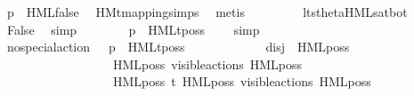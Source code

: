\begin{isabellebody}
\ {\isacartoucheopen}{\isasymtheta}{\isacharparenleft}{\kern0pt}p{\isacharparenright}{\kern0pt}\ {\isasymTurnstile}\ HML{\isacharunderscore}{\kern0pt}false{\isacartoucheclose}\ \isamarkupfalse%
\ HMt{\isacharunderscore}{\kern0pt}mapping{\isachardot}{\kern0pt}simps{\isacharparenleft}{\kern0pt}{}{\isacharparenright}{\kern0pt}\ \isamarkupfalse%
\ metis\ \isanewline
\ \ \ \ \ \ \isamarkupfalse%
\ lts{\isacharunderscore}{\kern0pt}theta{\isachardot}{\kern0pt}HML{\isacharunderscore}{\kern0pt}sat{\isacharunderscore}{\kern0pt}bot\ \isamarkupfalse%
\ False\ \isamarkupfalse%
\ simp\isanewline
\ \ \ \ \ \ \isamarkupfalse%
\ {\isacartoucheopen}p\ {\isasymTTurnstile}\ HMLt{\isacharunderscore}{\kern0pt}poss\ {\isasymalpha}\ {\isasymphi}{\isacartoucheclose}\ \isamarkupfalse%
\ simp\isanewline
\ \ \ \ \isamarkupfalse%
\isanewline
\ \ \ \ \isamarkupfalse%
\ \isamarkupfalse%
\ {\isacartoucheopen}no{\isacharunderscore}{\kern0pt}special{\isacharunderscore}{\kern0pt}action\ {\isasymalpha}\ {\isasymLongrightarrow}\ p\ {\isasymTTurnstile}\ HMLt{\isacharunderscore}{\kern0pt}poss\ {\isasymalpha}\ {\isasymphi}{\isacartoucheclose}\ \isamarkupfalse%
\ {\isacharminus}{\kern0pt}\isanewline
\ \ \ \ \ \ \isamarkupfalse%
\ {\isacharquery}{\kern0pt}disj\ {\isacharequal}{\kern0pt}\ {\isacartoucheopen}{\isacharbraceleft}{\kern0pt}HML{\isacharunderscore}{\kern0pt}poss\ {\isasymalpha}\ {\isasymsigma}{\isacharparenleft}{\kern0pt}{\isasymphi}{\isacharparenright}{\kern0pt}{\isacharcomma}{\kern0pt}\ \isanewline
\ \ \ \ \ \ \ \ \ \ \ \ \ \ \ \ \ \ HML{\isacharunderscore}{\kern0pt}poss\ {\isacharparenleft}{\kern0pt}{\isasymepsilon}{\isacharbrackleft}{\kern0pt}visible{\isacharunderscore}{\kern0pt}actions{\isacharbrackright}{\kern0pt}{\isacharparenright}{\kern0pt}\ {\isacharparenleft}{\kern0pt}HML{\isacharunderscore}{\kern0pt}poss\ {\isasymalpha}\ {\isasymsigma}{\isacharparenleft}{\kern0pt}{\isasymphi}{\isacharparenright}{\kern0pt}{\isacharparenright}{\kern0pt}{\isacharcomma}{\kern0pt}\isanewline
\ \ \ \ \ \ \ \ \ \ \ \ \ \ \ \ \ \ HML{\isacharunderscore}{\kern0pt}poss\ t{\isacharunderscore}{\kern0pt}{\isasymepsilon}\ {\isacharparenleft}{\kern0pt}HML{\isacharunderscore}{\kern0pt}poss\ {\isacharparenleft}{\kern0pt}{\isasymepsilon}{\isacharbrackleft}{\kern0pt}visible{\isacharunderscore}{\kern0pt}actions{\isacharbrackright}{\kern0pt}{\isacharparenright}{\kern0pt}\ {\isacharparenleft}{\kern0pt}HML{\isacharunderscore}{\kern0pt}poss\ {\isasymalpha}\ {\isasymsigma}{\isacharparenleft}{\kern0pt}{\isasymphi}{\isacharparenright}{\kern0pt}{\isacharparenright}{\kern0pt}{\isacharparenright}{\kern0pt}{\isacharbraceright}{\kern0pt}{\isacartoucheclose}\isanewline

\end{isabellebody}
